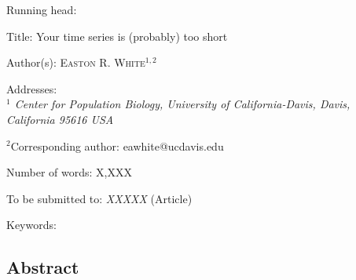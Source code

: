 \documentclass[12pt,]{article}
\title{}
\author{}
\date{}
\begin{document}
\begin{spacing}{1.5} %
    \begin{flushleft}
Running head: 
\vspace{3 mm}

Title: Your time series is (probably) too short
\vspace{7 mm}

Author(s): \textsc{Easton R. White$^{1,2}$} 
\vspace{3 mm}

Addresses: \\ \emph{$^1$ Center for Population Biology, University of California-Davis, Davis, California 95616 USA}
\vspace{3 mm}

$^2$Corresponding author: eawhite@ucdavis.edu
\vspace{3 mm}

Number of words: X,XXX 
\vspace{3 mm}

To be submitted to: \emph{XXXXX} (Article)
\vspace{3 mm}

Keywords: 

\vspace{3 mm}

\end{flushleft}
\end{spacing}

\linenumbers

\clearpage

\subsection{Abstract}\label{abstract}
\end{document}
